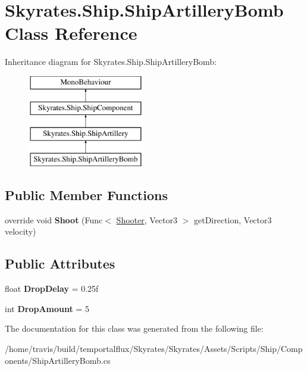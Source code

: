 \hypertarget{class_skyrates_1_1_ship_1_1_ship_artillery_bomb}{\section{Skyrates.\-Ship.\-Ship\-Artillery\-Bomb Class Reference}
\label{class_skyrates_1_1_ship_1_1_ship_artillery_bomb}
}
Inheritance diagram for Skyrates.\-Ship.\-Ship\-Artillery\-Bomb\-:\begin{figure}[H]
\begin{center}
\leavevmode
\includegraphics[height=4.000000cm]{class_skyrates_1_1_ship_1_1_ship_artillery_bomb}
\end{center}
\end{figure}
\subsection*{Public Member Functions}
\begin{DoxyCompactItemize}
\item 
\hypertarget{class_skyrates_1_1_ship_1_1_ship_artillery_bomb_a1b368d501baed8249abf0be57094d3c4}{override void {\bfseries Shoot} (Func$<$ \hyperlink{class_skyrates_1_1_mono_1_1_shooter}{Shooter}, Vector3 $>$ get\-Direction, Vector3 velocity)}\label{class_skyrates_1_1_ship_1_1_ship_artillery_bomb_a1b368d501baed8249abf0be57094d3c4}

\end{DoxyCompactItemize}
\subsection*{Public Attributes}
\begin{DoxyCompactItemize}
\item 
\hypertarget{class_skyrates_1_1_ship_1_1_ship_artillery_bomb_a744662e01171fd1c1a598ae0dca7786f}{float {\bfseries Drop\-Delay} = 0.\-25f}\label{class_skyrates_1_1_ship_1_1_ship_artillery_bomb_a744662e01171fd1c1a598ae0dca7786f}

\item 
\hypertarget{class_skyrates_1_1_ship_1_1_ship_artillery_bomb_aa4447efb191469f45266ed05fab19c4c}{int {\bfseries Drop\-Amount} = 5}\label{class_skyrates_1_1_ship_1_1_ship_artillery_bomb_aa4447efb191469f45266ed05fab19c4c}

\end{DoxyCompactItemize}


The documentation for this class was generated from the following file\-:\begin{DoxyCompactItemize}
\item 
/home/travis/build/temportalflux/\-Skyrates/\-Skyrates/\-Assets/\-Scripts/\-Ship/\-Components/Ship\-Artillery\-Bomb.\-cs\end{DoxyCompactItemize}
